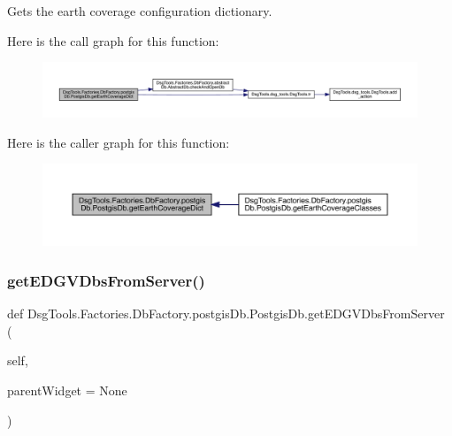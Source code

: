 \begin{DoxyVerb}Gets the earth coverage configuration dictionary.
\end{DoxyVerb}
 Here is the call graph for this function\+:
\nopagebreak
\begin{figure}[H]
\begin{center}
\leavevmode
\includegraphics[width=350pt]{class_dsg_tools_1_1_factories_1_1_db_factory_1_1postgis_db_1_1_postgis_db_a29b23c68ed63b4d2211db3db37d0194d_cgraph}
\end{center}
\end{figure}
Here is the caller graph for this function\+:
\nopagebreak
\begin{figure}[H]
\begin{center}
\leavevmode
\includegraphics[width=350pt]{class_dsg_tools_1_1_factories_1_1_db_factory_1_1postgis_db_1_1_postgis_db_a29b23c68ed63b4d2211db3db37d0194d_icgraph}
\end{center}
\end{figure}
\mbox{\label{class_dsg_tools_1_1_factories_1_1_db_factory_1_1postgis_db_1_1_postgis_db_a7136ab08673e14998876dd8f41f7694c}} 
\subsubsection{\texorpdfstring{get\+E\+D\+G\+V\+Dbs\+From\+Server()}{getEDGVDbsFromServer()}}
{\footnotesize\ttfamily def Dsg\+Tools.\+Factories.\+Db\+Factory.\+postgis\+Db.\+Postgis\+Db.\+get\+E\+D\+G\+V\+Dbs\+From\+Server (\begin{DoxyParamCaption}\item[{}]{self,  }\item[{}]{parent\+Widget = {\ttfamily None} }\end{DoxyParamCaption})}

